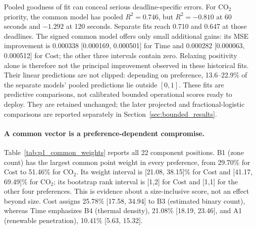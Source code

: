 Pooled goodness of fit can conceal serious deadline-specific errors.
For CO$_2$ priority, the common model has pooled $R^2=0.746$, but
$R^2=-0.810$ at 60 seconds and $-1.292$ at 120 seconds. Separate fits
reach 0.710 and 0.647 at those deadlines. The signed common model offers
only small additional gains: its MSE improvement is 0.000338
[0.000169, 0.000501] for Time and 0.000282 [0.000063, 0.000512] for Cost;
the other three intervals contain zero. Relaxing positivity alone is
therefore not the principal improvement observed in these historical fits.
Their linear predictions are not clipped: depending on preference, 13.6--22.9\% of the separate
models' pooled predictions lie outside $[0,1]$. These fits are predictive
comparisons, not calibrated bounded operational scores ready to deploy.
They are retained unchanged; the later projected and fractional-logistic
comparisons are reported separately in Section~\ref{sec:bounded_results}.

\paragraph{A common vector is a preference-dependent compromise.}
Table~\ref{tab:p1_common_weights} reports all 22 component positions.
B1 (zone count) has the largest common point weight in every preference,
from 29.70\% for Cost to 51.46\% for CO$_2$. Its weight interval is
[21.08, 38.15]\% for Cost and [41.17, 69.49]\% for CO$_2$; its bootstrap
rank interval is [1,2] for Cost and [1,1] for the other four preferences.
This is evidence about a size-inclusive score, not an effect beyond size.
Cost assigns 25.78\% [17.58, 34.94] to B3 (estimated binary count),
whereas Time emphasizes B4 (thermal density), 21.08\% [18.19, 23.46],
and A1 (renewable penetration), 10.41\% [5.63, 15.32].

